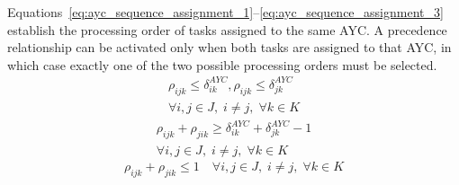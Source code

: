 Equations~\ref{eq:ayc_sequence_assignment_1}--\ref{eq:ayc_sequence_assignment_3} establish the processing order of tasks assigned to the same AYC. A precedence relationship can be activated only when both tasks are assigned to that AYC, in which case exactly one of the two possible processing orders must be selected.
\begin{equation}
\label{eq:ayc_sequence_assignment_1}
\begin{gathered}
\rho_{ijk}\leq\delta_{ik}^{AYC},\rho_{ijk}\leq\delta_{jk}^{AYC}\\ \forall i,j\in J,\;i\neq j,\;\forall k\in K
\end{gathered}
\end{equation}
\begin{equation}
\label{eq:ayc_sequence_assignment_2}
\begin{gathered}
\rho_{ijk}+\rho_{jik}\geq\delta_{ik}^{AYC}+\delta_{jk}^{AYC}-1\\ \forall i,j\in J,\;i\neq j,\;\forall k\in K
\end{gathered}
\end{equation}
\begin{equation}
\label{eq:ayc_sequence_assignment_3}
\rho_{ijk}+\rho_{jik}\leq1\quad \forall i,j\in J,\;i\neq j,\;\forall k\in K
\end{equation}

